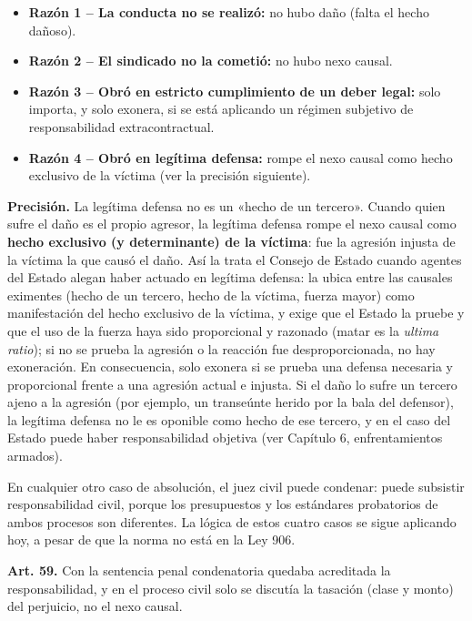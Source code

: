 \begin{itemize}
\item \textbf{Razón 1 – La conducta no se realizó:} no hubo daño (falta el hecho dañoso).
\item \textbf{Razón 2 – El sindicado no la cometió:} no hubo nexo causal.
\item \textbf{Razón 3 – Obró en estricto cumplimiento de un deber legal:} solo importa, y solo exonera, si se está aplicando un régimen subjetivo de responsabilidad extracontractual.
\item \textbf{Razón 4 – Obró en legítima defensa:} rompe el nexo causal como hecho exclusivo de la víctima (ver la precisión siguiente).
\end{itemize}
\begin{precision}
\textcolor[HTML]{9C2B2B}{\textbf{Precisión. }}La legítima defensa no es un «hecho de un tercero». Cuando quien sufre el daño es el propio agresor, la legítima defensa rompe el nexo causal como \textbf{hecho exclusivo (y determinante) de la víctima}: fue la agresión injusta de la víctima la que causó el daño. Así la trata el Consejo de Estado cuando agentes del Estado alegan haber actuado en legítima defensa: la ubica entre las causales eximentes (hecho de un tercero, hecho de la víctima, fuerza mayor) como manifestación del hecho exclusivo de la víctima, y exige que el Estado la pruebe y que el uso de la fuerza haya sido proporcional y razonado (matar es la \textit{ultima ratio}); si no se prueba la agresión o la reacción fue desproporcionada, no hay exoneración. En consecuencia, solo exonera si se prueba una defensa necesaria y proporcional frente a una agresión actual e injusta. Si el daño lo sufre un tercero ajeno a la agresión (por ejemplo, un transeúnte herido por la bala del defensor), la legítima defensa no le es oponible como hecho de ese tercero, y en el caso del Estado puede haber responsabilidad objetiva (ver Capítulo 6, enfrentamientos armados).
\end{precision}
En cualquier otro caso de absolución, el juez civil puede condenar: puede subsistir responsabilidad civil, porque los presupuestos y los estándares probatorios de ambos procesos son diferentes. La lógica de estos cuatro casos se sigue aplicando hoy, a pesar de que la norma no está en la Ley 906.

\textbf{Art. 59.} Con la sentencia penal condenatoria quedaba acreditada la responsabilidad, y en el proceso civil solo se discutía la tasación (clase y monto) del perjuicio, no el nexo causal.

